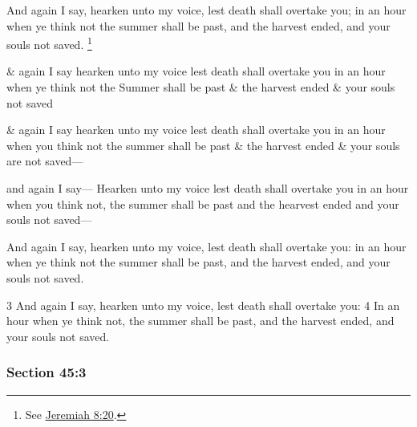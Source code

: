 		And again I say, hearken unto my voice, lest death shall overtake you; in an hour when ye think not the summer shall be past, and the harvest ended, and your souls not saved.%
			\footnote{%
				See \hyperref[JEREMIAH-8-20]{Jeremiah 8:20}.
				} 
		 
		\begin{framed}
		\scriptsize
			\begin{compactdesc}
				\item[JSP] \& again I say hearken unto my voice lest death shall overtake you in an hour when ye think not the Summer shall be past \& the harvest ended \& your souls not saved
				\item[Partridge] \& again I say hearken unto my voice lest death shall overtake you in an hour when you think not the summer shall be past \& the harvest ended \& your souls are not saved---
				\item[McLellin] and again I say--- Hearken unto my voice lest death shall overtake you in an hour when you think not, the summer shall be past and the hearvest ended and your souls not saved---
				\item[EMS] And again I say, hearken unto my voice, lest death shall overtake you: in an hour when ye think not the summer shall be past, and the harvest ended, and your souls not saved.
				\item[BC] 3 And again I say, hearken unto my voice, lest death shall overtake you: 4 In an hour when ye think not, the summer shall be past, and the harvest ended, and your souls not saved. 
			\end{compactdesc}
		\end{framed}
		 
	\subsubsection{Section 45:3} %
		\label{DC45-3}
		
